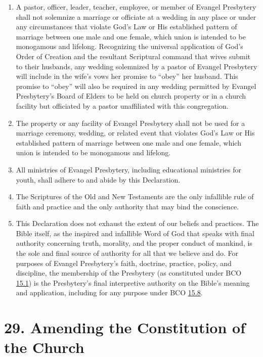 \documentclass[
]{book}
\providecommand{\tightlist}{%
  \setlength{\itemsep}{0pt}\setlength{\parskip}{0pt}}
\begin{document}
\begin{enumerate}
\def\labelenumi{\arabic{enumi}.}
\setcounter{enumi}{22}
\tightlist
\item
  A pastor, officer, leader, teacher, employee, or member of Evangel Presbytery shall not solemnize a marriage or officiate at a wedding in any place or under any circumstances that violate God's Law or His established pattern of marriage between one male and one female, which union is intended to be monogamous and lifelong. Recognizing the universal application of God's Order of Creation and the resultant Scriptural command that wives submit to their husbands, any wedding solemnized by a pastor of Evangel Presbytery will include in the wife's vows her promise to ``obey'' her husband. This promise to ``obey'' will also be required in any wedding permitted by Evangel Presbytery's Board of Elders to be held on church property or in a church facility but officiated by a pastor unaffiliated with this congregation.
\item
  The property or any facility of Evangel Presbytery shall not be used for a marriage ceremony, wedding, or related event that violates God's Law or His established pattern of marriage between one male and one female, which union is intended to be monogamous and lifelong.
\item
  All ministries of Evangel Presbytery, including educational ministries for youth, shall adhere to and abide by this Declaration.
\item
  The Scriptures of the Old and New Testaments are the only infallible rule of faith and practice and the only authority that may bind the conscience.
\item
  This Declaration does not exhaust the extent of our beliefs and practices. The Bible itself, as the inspired and infallible Word of God that speaks with final authority concerning truth, morality, and the proper conduct of mankind, is the sole and final source of authority for all that we believe and do. For purposes of Evangel Presbytery's faith, doctrine, practice, policy, and discipline, the membership of the Presbytery (as constituted under BCO \protect\hyperlink{15.1}{15.1}) is the Presbytery's final interpretive authority on the Bible's meaning and application, including for any purpose under BCO \protect\hyperlink{15.8}{15.8}.
\end{enumerate}

\hypertarget{amending-the-constitution-of-the-church}{%
\section*{29. Amending the Constitution of the Church}\label{amending-the-constitution-of-the-church}}
\end{document}
